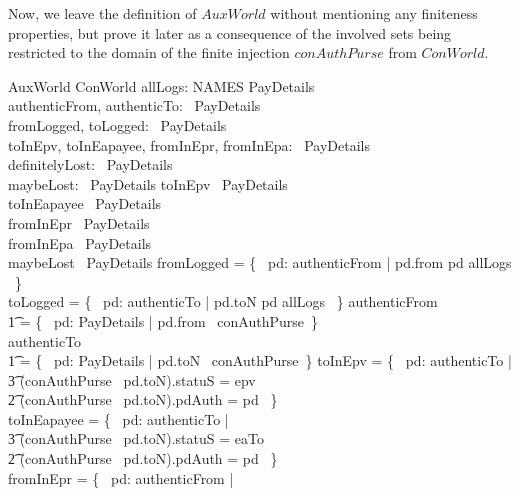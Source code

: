 Now, we leave the definition of $AuxWorld$ without mentioning
any finiteness properties, but prove it later as a consequence of
the involved sets being restricted to the domain of the finite injection $conAuthPurse$
from $ConWorld$.
%
\begin{LSDef}
\begin{schema}{AuxWorld}
   ConWorld
   \also
   allLogs: NAMES \rel PayDetails \\
   authenticFrom, authenticTo: \power~PayDetails \\
   fromLogged, toLogged: \power~PayDetails \\
   toInEpv, toInEapayee, fromInEpr, fromInEpa: \power~PayDetails \\
   definitelyLost: \power~PayDetails \\
   maybeLost: \power~PayDetails
\where
   toInEpv \in \finset~PayDetails \\
   toInEapayee \in \finset~PayDetails \\
   fromInEpr \in \finset~PayDetails \\
   fromInEpa \in \finset~PayDetails \\
   maybeLost \in \finset~PayDetails
   \also
   fromLogged = \{~ pd: authenticFrom | pd.from \mapsto pd \in allLogs ~\} \\
   toLogged = \{~ pd: authenticTo | pd.toN \mapsto pd \in allLogs ~\}
   \also
   authenticFrom \\
      \t1 = \{~ pd: PayDetails | pd.from \in \dom~conAuthPurse~\} \\
   authenticTo \\
      \t1 = \{~ pd: PayDetails | pd.toN \in \dom~conAuthPurse~\}
   \also
   toInEpv = \{~ pd: authenticTo | \\
          \t3 (conAuthPurse~ pd.toN).statuS = epv \\
          \t2 \land (conAuthPurse~ pd.toN).pdAuth = pd ~\} \\
   toInEapayee = \{~ pd: authenticTo | \\
          \t3 (conAuthPurse~ pd.toN).statuS = eaTo \\
          \t2 \land (conAuthPurse~ pd.toN).pdAuth = pd ~\} \\
   fromInEpr = \{~ pd: authenticFrom | \\

\end{schema}
\end{LSDef}
